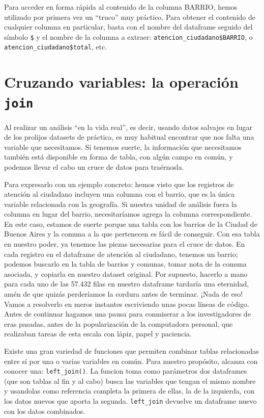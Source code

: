\documentclass[spanish,]{book}
\begin{document}
Para acceder en forma rápida al contenido de la columna BARRIO, hemos utilizado por primera vez un ``truco'' muy práctico. Para obtener el contenido de cualquier columna en particular, basta con el nombre del dataframe seguido del símbolo \texttt{\$} y el nombre de la columna a extraer: \texttt{atencion\_ciudadano\$BARRIO}, o \texttt{atencion\_ciudadano\$total}, etc.

\hypertarget{cruzando-variables-la-operaciuxf3n-join}{%
\section{\texorpdfstring{Cruzando variables: la operación \texttt{join}}{Cruzando variables: la operación join}}\label{cruzando-variables-la-operaciuxf3n-join}}

Al realizar un análisis ``en la vida real'', es decir, usando datos salvajes en lugar de los prolijos datasets de práctica, es muy habitual encontrar que nos falta una variable que necesitamos. Si tenemos suerte, la información que necesitamos también está disponible en forma de tabla, con algún campo en común, y podemos llevar el cabo un cruce de datos para traérnosla.

Para expresarlo con un ejemplo concreto: hemos visto que los registros de atención al ciudadano incluyen una columna con el barrio, que es la única variable relacionada con la geografía. Si nuestra unidad de análisis fuera la columna en lugar del barrio, necesitaríamos agrega la columna correspondiente. En este caso, estamos de suerte porque una tabla con los barrios de la Ciudad de Buenos Aires y la comuna a la que pertenecen es fácil de conseguir. Con esa tabla en nuestro poder, ya tenemos las piezas necesarias para el cruce de datos. En cada registro en el dataframe de atención al ciudadano, tenemos un barrio; podemos buscarlo en la tabla de barrios y comunas, tomar nota de la comuna asociada, y copiarla en nuestro dataset original. Por supuesto, hacerlo a mano para cada uno de las 57.432 filas en nuestro dataframe tardaría una eternidad, amén de que quizás perderíamos la cordura antes de terminar. ¡Nada de eso! Vamos a resolverlo en meros instantes escriviendo unas pocas líneas de código. Antes de continuar hagamos una pausa para conmiserar a los investigadores de eras pasadas, antes de la popularización de la computadora personal, que realizaban tareas de esta escala con lápiz, papel y paciencia.

Existe una gran variedad de funciones que permiten combinar tablas relacionadas entre sí por una o varias variables en común. Para nuestro propósito, alcanza con conocer una: \texttt{left\_join()}. La funcion toma como parámetros dos dataframes (que son tablas al fin y al cabo) busca las variables que tengan el mismo nombre y usandolas como referencia completa la primera de ellas, la de la izquierda, con los datos nuevos que aporta la segunda. \texttt{left\_join} devuelve un dataframe nuevo con los datos combinados.
\end{document}
